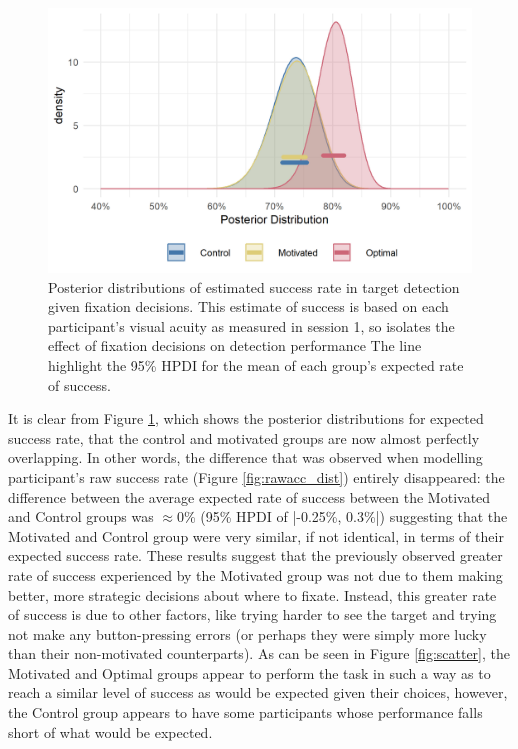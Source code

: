 \documentclass[vision,article,submit,moreauthors,pdftex,10pt,a4paper]{mdpi}
\begin{document}
\begin{figure}[H]
	\centering
	\includegraphics[width=12 cm]{../Figures/Model_stan_expacc_hpdi_wp.png}
	\caption{Posterior distributions of estimated success rate in target detection given fixation decisions. This estimate of success is based on each participant’s visual acuity as measured in session 1, so isolates the effect of fixation decisions on detection performance The line highlight the 95\% HPDI for the mean of each group’s expected rate of success.}
	\label{fig:expacc_dist}
\end{figure} 

It is clear from Figure \ref{fig:expacc_dist}, which shows the posterior distributions for expected success rate, that the control and motivated groups are now almost perfectly overlapping. In other words, the difference that was observed when modelling participant’s raw success rate (Figure \ref{fig:rawacc_dist}) entirely disappeared: the difference between the average expected rate of success between the Motivated and Control groups was $\approx$0\% (95\% HPDI of |-0.25\%, 0.3\%|) suggesting that the Motivated and Control group were very similar, if not identical, in terms of their expected success rate. These results suggest that the previously observed greater rate of success experienced by the Motivated group was not due to them making better, more strategic decisions about where to fixate. Instead, this greater rate of success is due to other factors, like trying harder to see the target and trying not make any button-pressing errors (or perhaps they were simply more lucky than their non-motivated counterparts). As can be seen in Figure \ref{fig:scatter}, the Motivated and Optimal groups appear to perform the task in such a way as to reach a similar level of success as would be expected given their choices, however, the Control group appears to have some participants whose performance falls short of what would be expected. 
\end{document}

